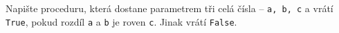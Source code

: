 \question[30]
Napište proceduru, která dostane parametrem tři celá čísla -- \texttt{a, b, c} a
vrátí \texttt{True}, pokud rozdíl \texttt{a} a \texttt{b} je roven \texttt{c}.
Jinak vrátí \texttt{False}.